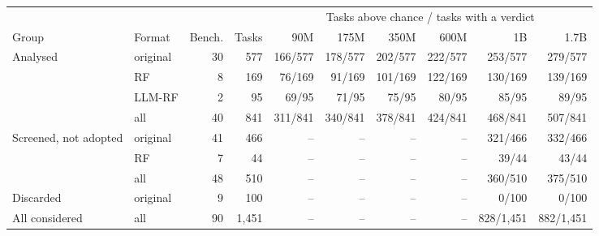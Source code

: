 \begin{tabular}{llrrrrrrrr}
\toprule
 & & & & \multicolumn{6}{c}{Tasks above chance / tasks with a verdict} \\
\cmidrule(lr){5-10}
Group & Format & Bench. & Tasks & 90M & 175M & 350M & 600M & 1B & 1.7B \\
\midrule
Analysed & original & 30 & 577 & 166/577 & 178/577 & 202/577 & 222/577 & 253/577 & 279/577 \\
 & RF & 8 & 169 & 76/169 & 91/169 & 101/169 & 122/169 & 130/169 & 139/169 \\
 & LLM-RF & 2 & 95 & 69/95 & 71/95 & 75/95 & 80/95 & 85/95 & 89/95 \\
 & all & 40 & 841 & 311/841 & 340/841 & 378/841 & 424/841 & 468/841 & 507/841 \\
\midrule
Screened, not adopted & original & 41 & 466 & -- & -- & -- & -- & 321/466 & 332/466 \\
 & RF & 7 & 44 & -- & -- & -- & -- & 39/44 & 43/44 \\
 & all & 48 & 510 & -- & -- & -- & -- & 360/510 & 375/510 \\
\midrule
Discarded & original & 9 & 100 & -- & -- & -- & -- & 0/100 & 0/100 \\
\midrule
All considered & all & 90 & 1{,}451 & -- & -- & -- & -- & 828/1{,}451 & 882/1{,}451 \\
\bottomrule
\end{tabular}
